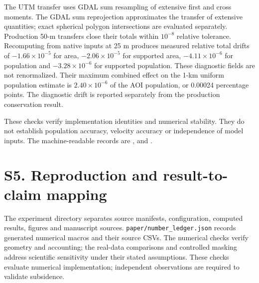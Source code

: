 \documentclass[10pt,a4paper]{article}
\begin{document}
The UTM transfer uses GDAL sum resampling of extensive first and cross moments. The GDAL sum reprojection approximates the transfer of extensive quantities; exact spherical polygon intersections are evaluated separately. Production 50-m transfers close their totals within $10^{-8}$ relative tolerance. Recomputing from native inputs at 25 m produces measured relative total drifts of $-1.66\times10^{-5}$ for area, $-2.06\times10^{-5}$ for supported area, $-4.11\times10^{-6}$ for population and $-3.28\times10^{-6}$ for supported population. These diagnostic fields are not renormalized. Their maximum combined effect on the 1-km uniform population estimate is $2.40\times10^{-6}$ of the AOI population, or 0.00024 percentage points. The diagnostic drift is reported separately from the production conservation result.

These checks verify implementation identities and numerical stability. They do not establish population accuracy, velocity accuracy or independence of model inputs. The machine-readable records are ,  and .


\section*{S5. Reproduction and result-to-claim mapping}
The experiment directory separates source manifests, configuration, computed results, figures and manuscript sources. \texttt{paper/number\_ledger.json} records generated numerical macros and their source CSVs. The numerical checks verify geometry and accounting; the real-data comparisons and controlled masking address scientific sensitivity under their stated assumptions. These checks evaluate numerical implementation; independent observations are required to validate subsidence.
\end{document}
